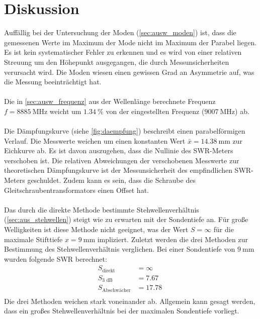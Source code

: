 \section{Diskussion}
\label{sec:Diskussion}
Auffällig bei der Untersuchung der Moden (\autoref{sec:ausw_moden}) ist, dass die gemessenen Werte im Maximum der Mode nicht im Maximum der Parabel liegen.
Es ist kein systematischer Fehler zu erkennen und es wird von einer relativen Streuung um den Höhepunkt ausgegangen, die durch Messunsicherheiten verursacht wird.
Die Moden wiesen einen gewissen Grad an Asymmetrie auf, was die Messung beeinträchtigt hat.
\\
\\
Die in \autoref{sec:ausw_frequenz} aus der Wellenlänge berechnete Frequenz $f = \SI{8885}{\mega\hertz}$ weicht um $\SI{1.34}{\percent}$ von der eingestellten Frequenz ($\SI{9007}{\mega\hertz}$) ab.
\\
\\
Die Dämpfungskurve (siehe \autoref{fig:daempfung}) beschreibt einen parabelförmigen Verlauf.
Die Messwerte weichen um einen konstanten Wert $\bar{x} = \SI{14.38}{\milli\metre}$ zur Eichkurve ab.
Es ist davon auszugehen, dass die Nullinie des SWR-Meters verschoben ist.
Die relativen Abweichungen der verschobenen Messwerte zur theoretischen Dämpfungskurve ist der Messunsicherheit des empfindlichen SWR-Meters geschuldet.
Zudem kann es sein, dass die Schraube des Gleitschraubentransformators einen Offset hat.
\\
\\
Das durch die direkte Methode bestimmte Stehwellenverhältnis (\autoref{sec:aus_stehwellen}) steigt wie zu erwarten mit der Sondentiefe an.
Für große Welligkeiten ist diese Methode nicht geeignet, was der Wert $S = \infty$ für die maximale Stifttiefe $x = \SI{9}{\milli\metre}$ impliziert.
Zuletzt werden die drei Methoden zur Bestimmung des Stehwellenverhältnis verglichen.
Bei einer Sondentiefe von $\SI{9}{\milli\metre}$ wurden folgende SWR berechnet:
\begin{align*}
    S_\text{direkt} &= \infty \\
    S_\text{3 dB} &= \SI{7.67}{} \\
    S_\text{Abschwächer} &= \SI{17.78}{} \\
\end{align*}
Die drei Methoden weichen stark voneinander ab.
Allgemein kann gesagt werden, dass ein großes Stehwellenverhältnis bei der maximalen Sondentiefe vorliegt.